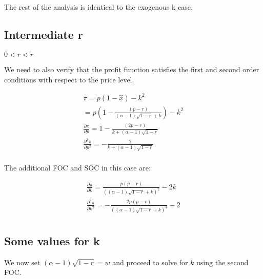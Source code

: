The rest of the analysis is identical to the exogenous k case. 

\subsection{Intermediate r}
$0<r<\tilde{r}$

We need to also verify that the profit function satisfies the first and second order conditions with respect to the price level.

\begin{align*}
\pi = p\left(1-\hat{x}\right) - k^2 \\
=p\left(1-\frac{ (p-r)}{(\alpha-1)
\sqrt{ 1-r }
+k} \right) -k^2
\\
\frac{\partial \pi }{\partial p} = 1-\frac{ (2p-r)}{
k+ (\alpha-1)\sqrt{ 1 -r }} \\
\frac{\partial^2 \pi }{\partial p^2}
= -\frac{ 2}{
k+ (\alpha-1)\sqrt{ 1 -r }} \\
\end{align*}

The additional FOC and SOC in this case are: 

\begin{align*}
\frac{\partial \pi}{\partial k} = \frac{ p(p-r)}{((\alpha-1)
\sqrt{ 1-r }
+k)^2} -2k
\\
\frac{\partial^2 \pi}{\partial k^2} = -\frac{2 p(p-r)}{((\alpha-1)
\sqrt{ 1-r }
+k)^3} -2
\\    
\end{align*}

\subsection{Some values for k}

We now set $ (\alpha-1)\sqrt{ 1 -r }=w$ and proceed to solve for $k$ using the second FOC.  


